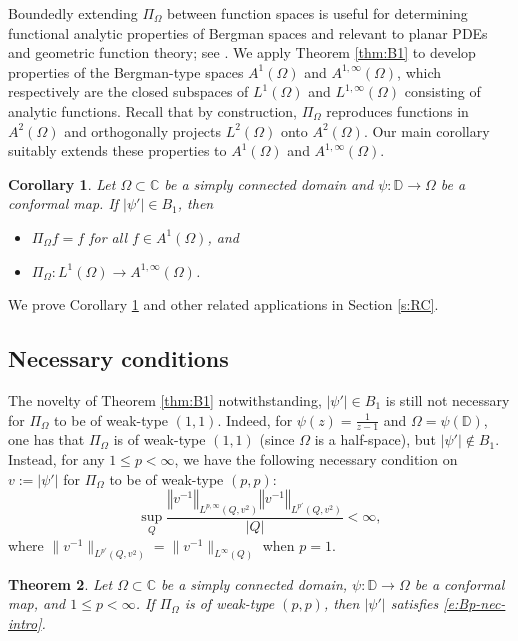 \documentclass{amsart}
\newcommand{\norm}[1]{\left\Vert {#1}\right\Vert}
\newtheorem{theorem}{Theorem}[section]
\newtheorem{corollary}[theorem]{Corollary}
\theoremstyle{definition}
\numberwithin{equation}{section}
\begin{document}
Boundedly extending $\Pi_{\Omega}$ between function spaces is useful for determining functional analytic properties of Bergman spaces and relevant to planar PDEs and geometric function theory; see \cite{Hed02}. We apply Theorem \ref{thm:B1} to develop properties of the Bergman-type spaces 
$A^1(\Omega)$ and $A^{1,\infty}(\Omega)$, 
which respectively are the closed subspaces of $L^1(\Omega)$ and $L^{1,\infty}(\Omega)$ 
consisting of analytic functions. Recall that by construction, $\Pi_\Omega$ reproduces functions in $A^2(\Omega)$ and orthogonally projects $L^2(\Omega)$ onto $A^2(\Omega)$. Our main corollary suitably extends these properties to $A^1(\Omega)$ and $A^{1,\infty}(\Omega)$.  
\begin{corollary}\label{c:A1}
Let $\Omega \subset \mathbb C$ be a simply connected domain and $\psi\colon \mathbb D \to \Omega$ be a conformal map. If $|\psi'| \in B_1$, then
 	\begin{itemize}
 	\item[I.] $\Pi_\Omega f = f$ for all $f \in A^1(\Omega)$, and 
 	\item[II.] $\Pi_\Omega \colon L^1(\Omega)\to A^{1,\infty}(\Omega)$.
 	\end{itemize}
\end{corollary}
\noindent We prove Corollary \ref{c:A1} and other related applications in Section \ref{s:RC}.


\subsection{Necessary conditions}\label{Subsection:Intro-Necessity}
The novelty of Theorem \ref{thm:B1} notwithstanding, $|\psi'| \in B_1$ is still not necessary for $\Pi_\Omega$ to be of weak-type $(1,1)$. Indeed, for $\psi(z) = \frac{1}{z-1}$ and $\Omega = \psi(\mathbb{D})$, one has that $\Pi_{\Omega}$ is of weak-type $(1,1)$ (since $\Omega$ is a half-space), but $|\psi'|\not\in B_1$. Instead, for any $1 \le p < \infty$, we have the following necessary condition on $v:=|\psi'|$ for $\Pi_{\Omega}$ to be of weak-type $(p,p)$: 
    \begin{equation}\label{e:Bp-nec-intro} \sup_{Q} \frac{\norm{v^{-1}}_{L^{p,\infty}(Q,v^2)} \norm{v^{-1}}_{L^{p'}(Q,v^2)}}{|Q|} < \infty,
    \end{equation}
where 
$\|v^{-1}\|_{L^{p'}(Q,v^2)}=\|v^{-1}\|_{L^{\infty}(Q)}$ when $p=1$. 
\begin{theorem}\label{thm:Nec}
    Let $\Omega \subset \mathbb{C}$ be a simply connected domain, $\psi \colon \mathbb{D} \rightarrow \Omega$ be a conformal map, and $1 \leq p < \infty$. If $\Pi_{\Omega}$ is of weak-type $(p,p)$, then $|\psi'|$ satisfies \eqref{e:Bp-nec-intro}. 
\end{theorem}
\end{document}
